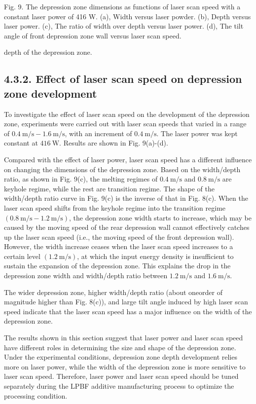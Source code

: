 \documentclass[10pt]{article}
\begin{document}
Fig. 9. The depression zone dimensions as functions of laser scan speed with a constant laser power of 416 W. (a), Width versus laser powder. (b), Depth versus laser power. (c), The ratio of width over depth versus laser power. (d), The tilt angle of front depression zone wall versus laser scan speed.

depth of the depression zone.

\subsection*{4.3.2. Effect of laser scan speed on depression zone development}
To investigate the effect of laser scan speed on the development of the depression zone, experiments were carried out with laser scan speeds that varied in a range of $0.4 \mathrm{~m} / \mathrm{s}-1.6 \mathrm{~m} / \mathrm{s}$, with an increment of $0.4 \mathrm{~m} / \mathrm{s}$. The laser power was kept constant at $416 \mathrm{~W}$. Results are shown in Fig. 9(a)-(d).

Compared with the effect of laser power, laser scan speed has a different influence on changing the dimensions of the depression zone. Based on the width/depth ratio, as shown in Fig. 9(c), the melting regimes of $0.4 \mathrm{~m} / \mathrm{s}$ and $0.8 \mathrm{~m} / \mathrm{s}$ are keyhole regime, while the rest are transition regime. The shape of the width/depth ratio curve in Fig. 9(c) is the inverse of that in Fig. 8(c). When the laser scan speed shifts from the keyhole regime into the transition regime $(0.8 \mathrm{~m} / \mathrm{s}-1.2 \mathrm{~m} / \mathrm{s})$, the depression zone width starts to increase, which may be caused by the moving speed of the rear depression wall cannot effectively catches up the laser scan speed (i.e., the moving speed of the front depression wall). However, the width increase ceases when the laser scan speed increases to a certain level $(1.2 \mathrm{~m} / \mathrm{s})$, at which the input energy density is insufficient to sustain the expansion of the depression zone. This explains the drop in the depression zone width and width/depth ratio between $1.2 \mathrm{~m} / \mathrm{s}$ and $1.6 \mathrm{~m} / \mathrm{s}$.

The wider depression zone, higher width/depth ratio (about oneorder of magnitude higher than Fig. 8(c)), and large tilt angle induced by high laser scan speed indicate that the laser scan speed has a major influence on the width of the depression zone.

The results shown in this section suggest that laser power and laser scan speed have different roles in determining the size and shape of the depression zone. Under the experimental conditions, depression zone depth development relies more on laser power, while the width of the depression zone is more sensitive to laser scan speed. Therefore, laser power and laser scan speed should be tuned separately during the LPBF additive manufacturing process to optimize the processing condition.
\end{document}
